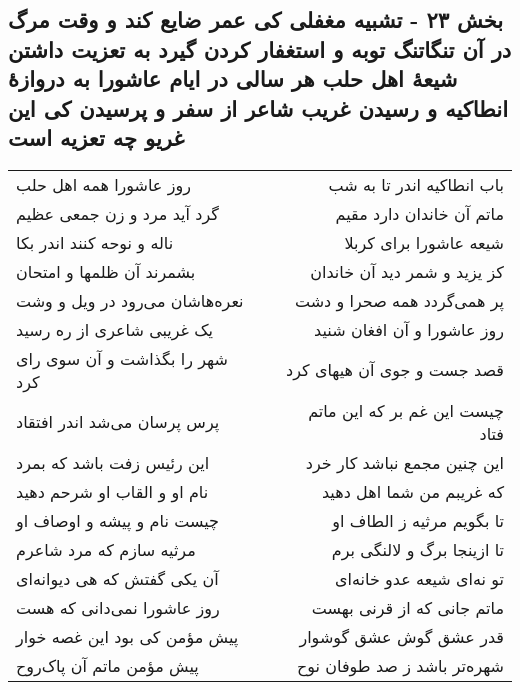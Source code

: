 \begin{center}
\section*{بخش ۲۳ - تشبیه مغفلی کی عمر ضایع کند و وقت مرگ در آن تنگاتنگ توبه و استغفار کردن گیرد به تعزیت داشتن شیعهٔ اهل حلب هر سالی در ایام عاشورا به دروازهٔ انطاکیه و رسیدن غریب شاعر از سفر و پرسیدن کی این غریو چه تعزیه است}
\label{sec:sh023}
\begin{longtable}{l p{0.5cm} r}
روز عاشورا همه اهل حلب
&&
باب انطاکیه اندر تا به شب
\\
گرد آید مرد و زن جمعی عظیم
&&
ماتم آن خاندان دارد مقیم
\\
ناله و نوحه کنند اندر بکا
&&
شیعه عاشورا برای کربلا
\\
بشمرند آن ظلمها و امتحان
&&
کز یزید و شمر دید آن خاندان
\\
نعره‌هاشان می‌رود در ویل و وشت
&&
پر همی‌گردد همه صحرا و دشت
\\
یک غریبی شاعری از ره رسید
&&
روز عاشورا و آن افغان شنید
\\
شهر را بگذاشت و آن سوی رای کرد
&&
قصد جست و جوی آن هیهای کرد
\\
پرس پرسان می‌شد اندر افتقاد
&&
چیست این غم بر که این ماتم فتاد
\\
این رئیس زفت باشد که بمرد
&&
این چنین مجمع نباشد کار خرد
\\
نام او و القاب او شرحم دهید
&&
که غریبم من شما اهل دهید
\\
چیست نام و پیشه و اوصاف او
&&
تا بگویم مرثیه ز الطاف او
\\
مرثیه سازم که مرد شاعرم
&&
تا ازینجا برگ و لالنگی برم
\\
آن یکی گفتش که هی دیوانه‌ای
&&
تو نه‌ای شیعه عدو خانه‌ای
\\
روز عاشورا نمی‌دانی که هست
&&
ماتم جانی که از قرنی بهست
\\
پیش مؤمن کی بود این غصه خوار
&&
قدر عشق گوش عشق گوشوار
\\
پیش مؤمن ماتم آن پاک‌روح
&&
شهره‌تر باشد ز صد طوفان نوح
\\
\end{longtable}
\end{center}
